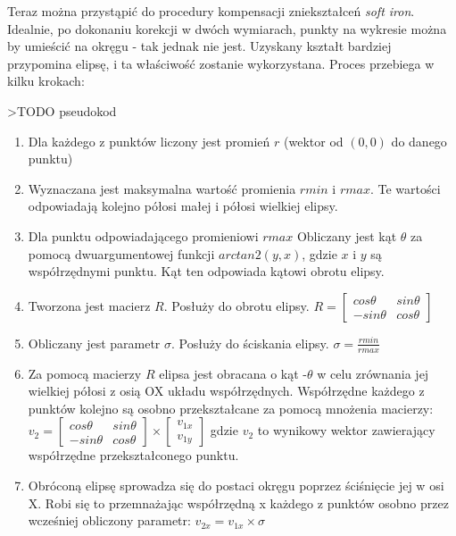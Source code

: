 Teraz można przystąpić do procedury kompensacji zniekształceń \emph{soft iron}. Idealnie, po dokonaniu korekcji w dwóch wymiarach, punkty na wykresie można by umieścić na okręgu - tak jednak nie jest. Uzyskany kształt bardziej przypomina elipsę, i ta właściwość zostanie wykorzystana. Proces przebiega w kilku krokach:

>TODO pseudokod
\begin{enumerate}
    \item Dla każdego z punktów liczony jest promień $r$ (wektor od $(0,0)$ do danego punktu)
    \item Wyznaczana jest maksymalna wartość promienia $rmin$ i $rmax$. Te wartości odpowiadają kolejno półosi małej i półosi wielkiej elipsy.
    \item Dla punktu odpowiadającego promieniowi $rmax$ Obliczany jest kąt $\theta$ za pomocą dwuargumentowej funkcji $arctan2(y,x)$, gdzie $x$ i $y$ są współrzędnymi punktu. Kąt ten odpowiada kątowi obrotu elipsy.
    \item Tworzona jest macierz $R$. Posłuży do obrotu elipsy.
    $R = \begin{bmatrix}
            cos\theta & sin\theta\\
            -sin\theta & cos\theta
        \end{bmatrix}$
    \item Obliczany jest parametr $\sigma$. Posłuży do ściskania elipsy. $\sigma = \frac{rmin}{rmax}$
    \item Za pomocą macierzy $R$ elipsa jest obracana o kąt -$\theta$ w celu zrównania jej wielkiej półosi z osią OX układu współrzędnych. Współrzędne każdego z punktów kolejno są osobno przekształcane za pomocą mnożenia macierzy:
    $   
        \mathit{v}_{2}
        =
        \begin{bmatrix}
            cos\theta & sin\theta\\
            -sin\theta & cos\theta
        \end{bmatrix}
        \times
        \begin{bmatrix}
            \mathit{v}_{1x}\\
            \mathit{v}_{1y}
        \end{bmatrix}
    $
    gdzie $\mathit{v}_{2}$ to wynikowy wektor zawierający współrzędne przekształconego punktu.
    \item Obróconą elipsę sprowadza się do postaci okręgu poprzez ściśnięcie jej w osi X. Robi się to przemnażając współrzędną x każdego z punktów osobno przez wcześniej obliczony parametr: $\mathit{v}_{2x} = \mathit{v}_{1x} \times \sigma$
\end{enumerate}


